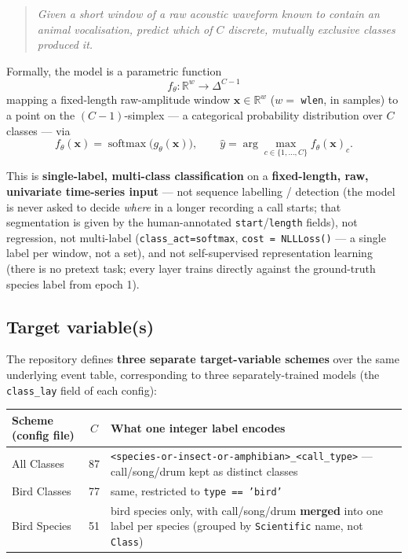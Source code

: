 \documentclass[11pt]{article}
\begin{document}
\begin{quote}
\itshape Given a short window of a raw acoustic waveform known to contain an
animal vocalisation, predict which of $C$ discrete, mutually exclusive
classes produced it.
\end{quote}

Formally, the model is a parametric function
\[
f_\theta : \mathbb{R}^{w} \to \Delta^{C-1}
\]
mapping a fixed-length raw-amplitude window $\mathbf{x}\in\mathbb{R}^{w}$
($w=$ \texttt{wlen}, in samples) to a point on the $(C-1)$-simplex --- a
categorical probability distribution over $C$ classes --- via
\[
f_\theta(\mathbf{x}) = \operatorname{softmax}\big(g_\theta(\mathbf{x})\big),
\qquad
\hat y = \arg\max_{c\in\{1,\dots,C\}} f_\theta(\mathbf{x})_c .
\]

This is \textbf{single-label, multi-class classification} on a
\textbf{fixed-length, raw, univariate time-series input} --- not sequence
labelling / detection (the model is never asked to decide \emph{where} in a
longer recording a call starts; that segmentation is given by the
human-annotated \texttt{start}/\texttt{length} fields), not regression, not
multi-label (\texttt{class\_act=softmax}, \texttt{cost = NLLLoss()} --- a
single label per window, not a set), and not self-supervised representation
learning (there is no pretext task; every layer trains directly against the
ground-truth species label from epoch 1).

\subsection{Target variable(s)}
\label{sec:A2}

The repository defines \textbf{three separate target-variable schemes} over
the same underlying event table, corresponding to three separately-trained
models (the \texttt{class\_lay} field of each config):

\begin{table}[h]
\centering
\begin{tabularx}{\textwidth}{l c Y}
\toprule
Scheme (config file) & $C$ & What one integer label encodes \\
\midrule
All Classes  & 87 & \texttt{<species-or-insect-or-amphibian>\_<call\_type>} --- call/song/drum kept as distinct classes \\
Bird Classes & 77 & same, restricted to \texttt{type == 'bird'} \\
Bird Species & 51 & bird species only, with call/song/drum \textbf{merged} into one label per species (grouped by \texttt{Scientific} name, not \texttt{Class}) \\
\bottomrule
\end{tabularx}
\end{table}
\end{document}
